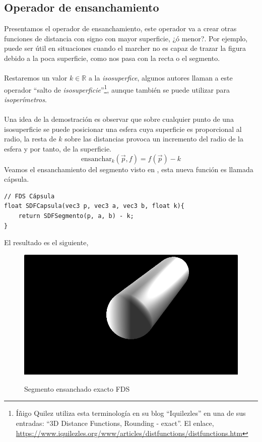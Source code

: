 \subsection{Operador de ensanchamiento}
Presentamos el operador de ensanchamiento, este operador va a crear otras funciones de distancia con signo con mayor superficie, ¿ó menor?. Por ejemplo, puede ser útil en situaciones cuando el marcher no es capaz de trazar la figura debido a la poca superficie, como nos pasa con la recta o el segmento.\\\\
Restaremos un valor \(k\in\mathbb{R}\) a la \textit{isosuperfice}, algunos autores llaman a este operador \enquote{salto de \textit{isosuperficie}}\footnote{Íñigo Quilez utiliza esta terminología en su blog \enquote{Iquilezles} en una de sus entradas: \enquote{3D Distance Functions, Rounding - exact}. El enlace, \url{https://www.iquilezles.org/www/articles/distfunctions/distfunctions.htm}}, aunque también se puede utilizar para \textit{isoperímetros}.\\\\ 
Una idea de la demostración es observar que sobre cualquier punto de una isosuperficie se puede posicionar una esfera cuya superficie es proporcional al radio, la resta de \(k\) sobre las distancias provoca un incremento del radio de la esfera y por tanto, de la superficie.  
\[\text{ensanchar}_k(\Vec{p}, f)=f(\Vec{p})-k\]
Veamos el ensanchamiento del segmento visto en , esta nueva función es llamada cápsula.
\begin{lstlisting}
// FDS Cápsula
float SDFCapsula(vec3 p, vec3 a, vec3 b, float k){
	return SDFSegmento(p, a, b) - k;
}
\end{lstlisting}
El resultado es el siguiente,
\begin{figure}[H]
  \centering
  \captionsetup{justification=centering}%
  \includegraphics[width=1.0\textwidth]{secciones/imagenes/sdf/3d/sdf_capsula.png}\label{fig:capsula}
  \caption{Segmento ensanchado exacto FDS}
\end{figure}

